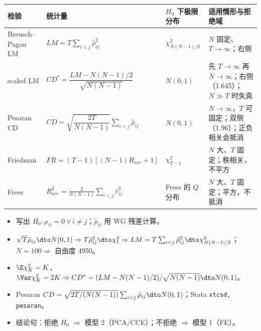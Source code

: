 \begin{center}
\small
\begin{tabularx}{\linewidth}{>{\raggedright\arraybackslash}p{2.6cm}>{\raggedright\arraybackslash}p{4.6cm}>{\raggedright\arraybackslash}p{2.5cm}L}
\toprule
检验 & 统计量 & $H_0$ 下极限分布 & 适用情形与拒绝域\\
\midrule
Breusch--Pagan LM & $LM=T\sum_{i<j}\hat\rho_{ij}^2$ & $\chi^2_{N(N-1)/2}$ & $N$ 固定、$T\to\infty$；右侧\\
scaled LM & $CD^*=\dfrac{LM-N(N-1)/2}{\sqrt{N(N-1)}}$ & $N(0,1)$ & 先 $T\to\infty$ 再 $N\to\infty$；右侧（1.645）；$N\gg T$ 时失真\\
Pesaran CD & $CD=\sqrt{\dfrac{2T}{N(N-1)}}\sum_{i<j}\hat\rho_{ij}$ & $N(0,1)$ & $N\to\infty$，$T$ 可固定；双侧（1.96）；正负相关会抵消\\
Friedman & $FR=(T-1)[(N-1)R_{ave}+1]$ & $\chi^2_{T-1}$ & $N$ 大、$T$ 固定；秩相关，不平方\\
Frees & $R^2_{ave}=\frac2{N(N-1)}\sum_{i<j}\hat r_{ij}^2$ & Frees 的 $Q$ 分布 & $N$ 大、$T$ 固定；平方，不抵消\\
\bottomrule
\end{tabularx}
\label{tab:U14b-tests}
\end{center}

\begin{keypt}[截面相关检验的答题要点]
\begin{itemize}
  \item 写出 $H_0:\rho_{ij}=0\ \forall\,i\neq j$；$\hat\rho_{ij}$ 用 WG 残差计算。
  \item $\sqrt T\hat\rho_{ij}\dto N(0,1)\Rightarrow T\hat\rho_{ij}^2\dto\chi^2_1\Rightarrow LM=T\sum_{i<j}\hat\rho_{ij}^2\dto\chi^2_{N(N-1)/2}$；$N=100\Rightarrow$ 自由度 4950。
  \item $\E\chi^2_K=K$、$\Var\chi^2_K=2K\Rightarrow CD^*=(LM-N(N-1)/2)/\sqrt{N(N-1)}\dto N(0,1)$。
  \item Pesaran $CD=\sqrt{2T/(N(N-1))}\sum_{i<j}\hat\rho_{ij}\dto N(0,1)$；Stata \texttt{xtcsd, pesaran}。
  \item 结论句：拒绝 $H_0$ $\Rightarrow$ 模型 2（PCA/CCE）；不拒绝 $\Rightarrow$ 模型 1（FE）。
\end{itemize}
\end{keypt}


